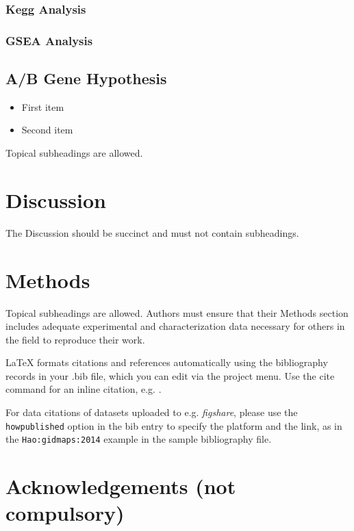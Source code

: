 \documentclass[fleqn,10pt]{wlscirep}
\begin{document}
\subsubsection{Kegg Analysis}

\subsubsection{GSEA Analysis}

\subsection*{A/B Gene Hypothesis}

\begin{itemize}
\item First item
\item Second item
\end{itemize}


 
Topical subheadings are allowed.

\section*{Discussion}

The Discussion should be succinct and must not contain subheadings.

\section*{Methods}

Topical subheadings are allowed. Authors must ensure that their Methods section includes adequate experimental and characterization data necessary for others in the field to reproduce their work.



\noindent LaTeX formats citations and references automatically using the bibliography records in your .bib file, which you can edit via the project menu. Use the cite command for an inline citation, e.g.  \cite{Hao:gidmaps:2014}.

For data citations of datasets uploaded to e.g. \emph{figshare}, please use the \verb|howpublished| option in the bib entry to specify the platform and the link, as in the \verb|Hao:gidmaps:2014| example in the sample bibliography file.

\section*{Acknowledgements (not compulsory)}
\end{document}

